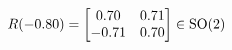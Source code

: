 \documentclass[preview]{standalone}
\begin{document}
\begin{align*}
\special{dvisvgm:raw <g id='unique000'>}R(-0.80) = \begin{bmatrix} 0.70 & 0.71 \\ -0.71 & 0.70 \end{bmatrix} \in \text{SO}(2)\special{dvisvgm:raw </g>}
\end{align*}
\end{document}
